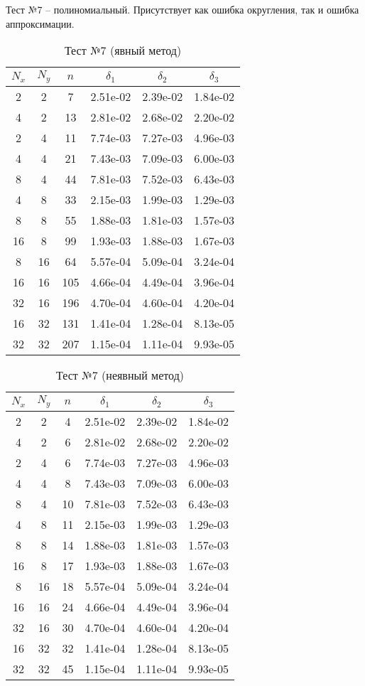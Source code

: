 \newpage
Тест №7 -- полиномиальный. Присутствует как ошибка округления, так и ошибка аппроксимации.
\begin{table}[H]
	\centering
	\begin{tabular}{*6c}
		\toprule
		$N_x$ & $N_y$ & $n$ & $\delta_1$ & $\delta_2$ & $\delta_3$ \\
		\midrule
		2 & 2 & 7 & 2.51e-02 & 2.39e-02 & 1.84e-02 \\
		4 & 2 & 13 & 2.81e-02 & 2.68e-02 & 2.20e-02 \\
		2 & 4 & 11 & 7.74e-03 & 7.27e-03 & 4.96e-03 \\
		4 & 4 & 21 & 7.43e-03 & 7.09e-03 & 6.00e-03 \\
		8 & 4 & 44 & 7.81e-03 & 7.52e-03 & 6.43e-03 \\
		4 & 8 & 33 & 2.15e-03 & 1.99e-03 & 1.29e-03 \\
		8 & 8 & 55 & 1.88e-03 & 1.81e-03 & 1.57e-03 \\
		16 & 8 & 99 & 1.93e-03 & 1.88e-03 & 1.67e-03 \\
		8 & 16 & 64 & 5.57e-04 & 5.09e-04 & 3.24e-04 \\
		16 & 16 & 105 & 4.66e-04 & 4.49e-04 & 3.96e-04 \\
		32 & 16 & 196 & 4.70e-04 & 4.60e-04 & 4.20e-04 \\
		16 & 32 & 131 & 1.41e-04 & 1.28e-04 & 8.13e-05 \\
		32 & 32 & 207 & 1.15e-04 & 1.11e-04 & 9.93e-05 \\
		\bottomrule
	\end{tabular}
	\caption{Тест №7 (явный метод)}
\end{table}
\begin{table}[H]
	\centering
	\begin{tabular}{*6c}
		\toprule
		$N_x$ & $N_y$ & $n$ & $\delta_1$ & $\delta_2$ & $\delta_3$ \\
		\midrule
		2 & 2 & 4 & 2.51e-02 & 2.39e-02 & 1.84e-02 \\
		4 & 2 & 6 & 2.81e-02 & 2.68e-02 & 2.20e-02 \\
		2 & 4 & 6 & 7.74e-03 & 7.27e-03 & 4.96e-03 \\
		4 & 4 & 8 & 7.43e-03 & 7.09e-03 & 6.00e-03 \\
		8 & 4 & 10 & 7.81e-03 & 7.52e-03 & 6.43e-03 \\
		4 & 8 & 11 & 2.15e-03 & 1.99e-03 & 1.29e-03 \\
		8 & 8 & 14 & 1.88e-03 & 1.81e-03 & 1.57e-03 \\
		16 & 8 & 17 & 1.93e-03 & 1.88e-03 & 1.67e-03 \\
		8 & 16 & 18 & 5.57e-04 & 5.09e-04 & 3.24e-04 \\
		16 & 16 & 24 & 4.66e-04 & 4.49e-04 & 3.96e-04 \\
		32 & 16 & 30 & 4.70e-04 & 4.60e-04 & 4.20e-04 \\
		16 & 32 & 32 & 1.41e-04 & 1.28e-04 & 8.13e-05 \\
		32 & 32 & 45 & 1.15e-04 & 1.11e-04 & 9.93e-05 \\
		\bottomrule
	\end{tabular}
	\caption{Тест №7 (неявный метод)}
\end{table}

